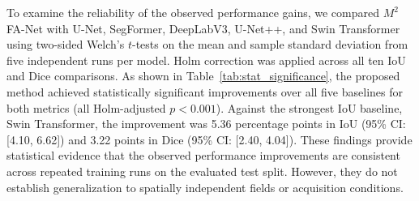 \documentclass[pdflatex,sn-mathphys-num]{sn-jnl}
\begin{document}
\begin{table}[t]
    \centering
    
    \small
    \setlength{\tabcolsep}{4pt}
    \renewcommand{\arraystretch}{1.2}
    \caption{Statistical comparison of $M^2$FA-Net against selected baselines using two-sided Welch's $t$-tests on five independent runs. Improvements and confidence intervals are in percentage points. $p_{\mathrm{Holm}}$ is adjusted across 10 comparisons (five baselines $\times$ two metrics). The 95\% confidence intervals are unadjusted individual intervals.}
    \label{tab:stat_significance}
\end{table}


To examine the reliability of the observed performance gains, we compared $M^2$FA-Net with U-Net, SegFormer, DeepLabV3, U-Net++, and Swin Transformer using two-sided Welch's $t$-tests on the mean and sample standard deviation from five independent runs per model. Holm correction was applied across all ten IoU and Dice comparisons. As shown in Table~\ref{tab:stat_significance}, the proposed method achieved statistically significant improvements over all five baselines for both metrics (all Holm-adjusted $p<0.001$). Against the strongest IoU baseline, Swin Transformer, the improvement was 5.36 percentage points in IoU (95\% CI: [4.10, 6.62]) and 3.22 points in Dice (95\% CI: [2.40, 4.04]). These findings provide statistical evidence
that the observed performance improvements are
consistent across repeated training runs on the
evaluated test split. However, they do not
establish generalization to spatially independent
fields or acquisition conditions.
\end{document}
